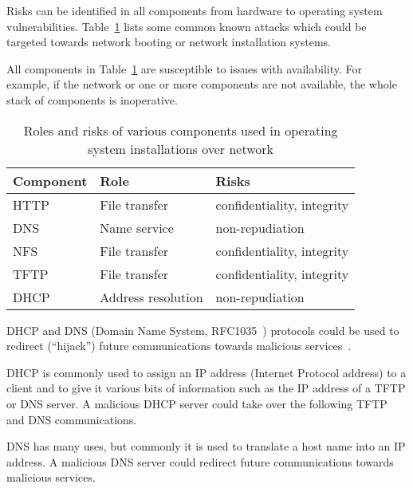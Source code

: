 Risks can be identified in all components from hardware to operating
system vulnerabilities. Table~\ref{tab:risks_table} lists some
common known attacks which could be targeted towards network booting
or network installation systems.

All components in Table~\ref{tab:risks_table} are susceptible to
issues with availability. For example, if the network or one or more
components are not available, the whole stack of components is
inoperative.

\begin{table}[!ht]
  \def\arraystretch{1.1}%
  \begin{center}
    \caption{Roles and risks of various components used in operating
      system installations over network\label{tab:risks_table}}
    \begin{tabular}{| l | l | l |}
      \hline
      Component   & Role               & Risks                      \\
      \hline
      HTTP        & File transfer      & confidentiality, integrity \\
      DNS         & Name service       & non-repudiation            \\
      NFS         & File transfer      & confidentiality, integrity \\
      TFTP        & File transfer      & confidentiality, integrity \\
      DHCP        & Address resolution & non-repudiation            \\
      \hline
    \end{tabular}
  \end{center}
\end{table}


DHCP and DNS (Domain Name System, RFC1035~\cite{rfc1035}) protocols
could be used to redirect (``hijack'') future communications towards
malicious services~\cite{green2005dns}\cite{ornaghi2003man}.

DHCP is commonly used to assign an IP address (Internet Protocol
address) to a client and to give it various bits of information such
as the IP address of a TFTP or DNS server. A malicious DHCP server
could take over the following TFTP and DNS communications.

DNS has many uses, but commonly it is used to translate a host name
into an IP address. A malicious DNS server could redirect future
communications towards malicious services.


